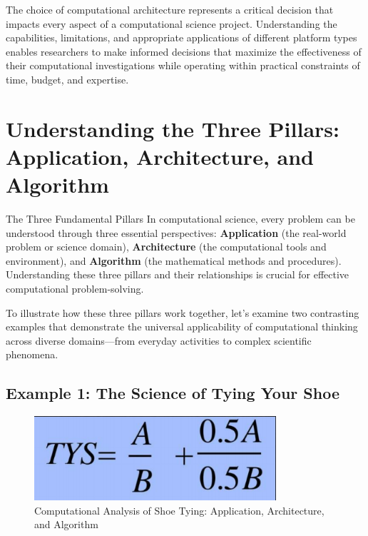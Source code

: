The choice of computational architecture represents a critical decision that impacts every aspect of a computational science project. Understanding the capabilities, limitations, and appropriate applications of different platform types enables researchers to make informed decisions that maximize the effectiveness of their computational investigations while operating within practical constraints of time, budget, and expertise.

\section{Understanding the Three Pillars: Application, Architecture, and Algorithm}

\begin{conceptcard}{The Three Fundamental Pillars}
In computational science, every problem can be understood through three essential perspectives: \textbf{Application} (the real-world problem or science domain), \textbf{Architecture} (the computational tools and environment), and \textbf{Algorithm} (the mathematical methods and procedures). Understanding these three pillars and their relationships is crucial for effective computational problem-solving.
\end{conceptcard}

To illustrate how these three pillars work together, let's examine two contrasting examples that demonstrate the universal applicability of computational thinking across diverse domains—from everyday activities to complex scientific phenomena.

\subsection{Example 1: The Science of Tying Your Shoe}

\begin{figure}[h]
 \centering
 \includegraphics[width=0.8\textwidth]{images/shoe_tying_example.png}
 \caption{Computational Analysis of Shoe Tying: Application, Architecture, and Algorithm}
 \label{fig:shoe_tying_example}
\end{figure}

